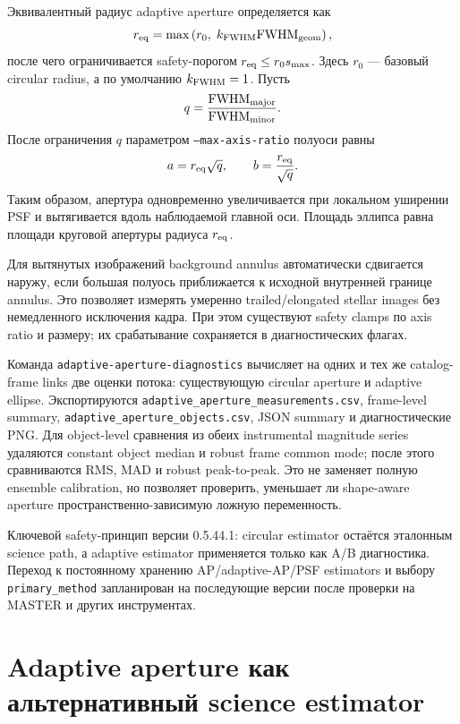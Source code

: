 Эквивалентный радиус adaptive aperture определяется как
\begin{equation}
 r_{\rm eq}=\max\left(r_0,\;k_{\rm FWHM}{\rm FWHM}_{\rm geom}\right),
\end{equation}
после чего ограничивается safety-порогом
$r_{\rm eq}\le r_0 s_{\rm max}$. Здесь $r_0$ --- базовый circular radius, а по умолчанию
$k_{\rm FWHM}=1$. Пусть
\begin{equation}
 q=\frac{{\rm FWHM}_{\rm major}}{{\rm FWHM}_{\rm minor}}.
\end{equation}
После ограничения $q$ параметром \texttt{--max-axis-ratio} полуоси равны
\begin{equation}
 a=r_{\rm eq}\sqrt{q},\qquad b=\frac{r_{\rm eq}}{\sqrt{q}}.
\end{equation}
Таким образом, апертура одновременно увеличивается при локальном уширении PSF и вытягивается
вдоль наблюдаемой главной оси. Площадь эллипса равна площади круговой апертуры радиуса
$r_{\rm eq}$.

Для вытянутых изображений background annulus автоматически сдвигается наружу, если большая
полуось приближается к исходной внутренней границе annulus. Это позволяет измерять умеренно
trailed/elongated stellar images без немедленного исключения кадра. При этом существуют safety
clamps по axis ratio и размеру; их срабатывание сохраняется в диагностических флагах.

Команда \texttt{adaptive-aperture-diagnostics} вычисляет на одних и тех же catalog-frame links
две оценки потока: существующую circular aperture и adaptive ellipse. Экспортируются
\texttt{adaptive\_aperture\_measurements.csv}, frame-level summary,
\texttt{adaptive\_aperture\_objects.csv}, JSON summary и диагностические PNG. Для object-level
сравнения из обеих instrumental magnitude series удаляются constant object median и robust
frame common mode; после этого сравниваются RMS, MAD и robust peak-to-peak. Это не заменяет
полную ensemble calibration, но позволяет проверить, уменьшает ли shape-aware aperture
пространственно-зависимую ложную переменность.

Ключевой safety-принцип версии 0.5.44.1: circular estimator остаётся эталонным science path,
а adaptive estimator применяется только как A/B диагностика. Переход к постоянному хранению
AP/adaptive-AP/PSF estimators и выбору \texttt{primary\_method} запланирован на последующие
версии после проверки на MASTER и других инструментах.

\section{Adaptive aperture как альтернативный science estimator}
\label{sec:adaptive-aperture-stage2}


